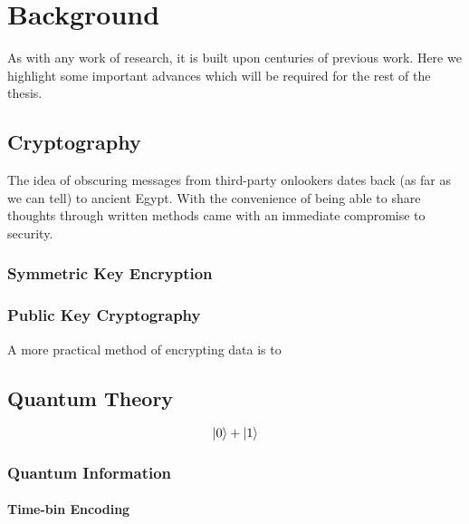 %
%
\glsresetall
\graphicspath{{./chapters/chapter02/fig02/}}

\let\textcircled=\pgftextcircled
\chapter{Background}
\label{chap:background}

As with any work of research, it is built upon centuries of previous work. Here we highlight some important advances which will be required for the rest of the thesis.

\section{Cryptography}
\label{sec1:crypto}

The idea of obscuring messages from third-party onlookers dates back (as far as we can tell) to ancient Egypt. With the convenience of being able to share thoughts through written methods came with an immediate compromise to security.

\subsection{Symmetric Key Encryption}

\subsection{Public Key Cryptography}

A more practical method of encrypting data is to 

\section{Quantum Theory}

\begin{equation}
	\ket{0} + \ket{1}
\end{equation}

\subsection{Quantum Information}

\subsubsection{Time-bin Encoding}

